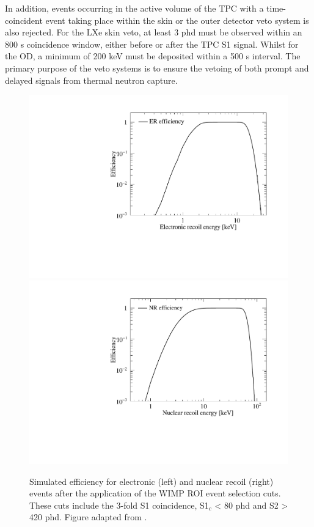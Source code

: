 In addition, events occurring in the active volume of the TPC with a time-coincident event taking place within the skin or the outer detector veto system is also rejected. For the LXe skin veto, at least 3 phd must be observed within an 800 \micro{}s coincidence window, either before or after the TPC S1 signal. Whilst for the OD, a minimum of 200 keV must be deposited within a 500 \micro{}s interval. The primary purpose of the veto systems is to ensure the vetoing of both prompt \gamma and delayed signals from thermal neutron capture.

%
\begin{figure}[b]
    \centering
    \includegraphics[scale=0.39]{Chapter_5/Figures/er_efficiency.pdf}
    \includegraphics[scale=0.39]{Chapter_5/Figures/nr_efficiency.pdf}
    \caption[Simulated efficiency for electronic (left) and nuclear recoil (right) events after the application of the WIMP ROI event selection cuts.]%
    {Simulated efficiency for electronic (left) and nuclear recoil (right) events after the application of the WIMP ROI event selection cuts. These cuts include the 3-fold S1 coincidence, S1$_{c}$ < 80 phd and S2 > 420 phd. Figure adapted from \cite{akerib2018projected}.}
    \label{fig:lz_er_nr_efficiency}
\end{figure}
%

